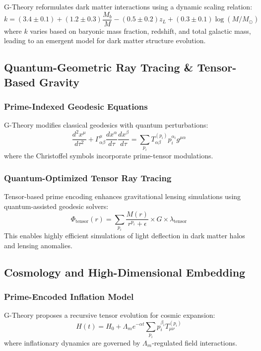 \documentclass{article}
\theoremstyle{plain}
\begin{document}
G-Theory reformulates dark matter interactions using a dynamic scaling relation:
\begin{equation}
k = (3.4 \pm 0.1) + (1.2 \pm 0.3) \frac{M_b}{M} - (0.5 \pm 0.2) z_L + (0.3 \pm 0.1) \log(M/M_\odot)
\end{equation}
where \(k\) varies based on baryonic mass fraction, redshift, and total galactic mass, leading to an emergent model for dark matter structure evolution.

\subsection{Quantum-Geometric Ray Tracing \& Tensor-Based Gravity}

\subsubsection{Prime-Indexed Geodesic Equations}
G-Theory modifies classical geodesics with quantum perturbations:
\begin{equation}
\frac{d^2 x^\mu}{d \tau^2} + \Gamma^\mu_{\alpha \beta} \frac{dx^\alpha}{d \tau} \frac{dx^\beta}{d \tau} = \sum_{p_i} T^{(p_i)}_{\alpha \beta} p_i^{\alpha_i} g^{\mu\alpha}
\end{equation}
where the Christoffel symbols incorporate prime-tensor modulations.

\subsubsection{Quantum-Optimized Tensor Ray Tracing}
Tensor-based prime encoding enhances gravitational lensing simulations using quantum-assisted geodesic solvers:
\begin{equation}
\Phi_{\text{tensor}}(r) = \sum_{p_i} \frac{M(r)}{r^{p_i} + \epsilon} \times G \times \lambda_{\text{tensor}}
\end{equation}
This enables highly efficient simulations of light deflection in dark matter halos and lensing anomalies.

\subsection{Cosmology and High-Dimensional Embedding}

\subsubsection{Prime-Encoded Inflation Model}
G-Theory proposes a recursive tensor evolution for cosmic expansion:
\begin{equation}
H(t) = H_0 + \Lambda_m e^{- \alpha t} \sum_{p_i} p_i^{\beta_i} T_{\mu\nu}^{(p_i)}
\end{equation}
where inflationary dynamics are governed by \(\Lambda_m\)-regulated field interactions.
\end{document}
